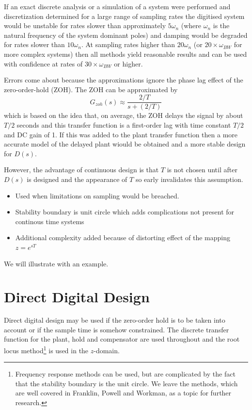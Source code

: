 If an exact discrete analysis or a simulation of a system were performed and
discretization determined for a large range of sampling rates the digitised
system would be unstable for rates slower than approximately $5\omega_n$
(where $\omega_n$ is the natural frequency of the system dominant poles)
and damping would be degraded for rates slower than $10\omega_n$.
At sampling rates higher than $20\omega_n$ (or $20\times \omega_{BW}$ for
more complex systems) then all methods yield reasonable results and can be used
with confidence at rates of $30\times \omega_{BW}$ or higher.

Errors come about because the approximations ignore the phase lag effect of the
zero-order-hold (ZOH). The ZOH can be approximated by $$G_{zoh}(s)\approx
\frac{2/T}{s+(2/T)}$$ which is based on the idea that, on average, the ZOH delays
the signal by about $T/2$ seconds and this transfer function is a first-order
lag with time constant $T/2$ and DC gain of 1. If this was added to the plant
transfer function then a more accurate model of the delayed plant wiould be
obtained and a more stable design for $D(s)$.

However, the advantage of continuous design is that $T$ is not chosen until
after $D(s)$ is designed and the appearance of $T$ so early invalidates this
assumption.

\ifslidesonly
\begin{slide}
\begin{itemize}
\item Used when limitations on sampling would be breached.
\item Stability boundary is unit circle which adds complications not present for
continous time systems
\item Additional complexity added because of distorting effect of the mapping $z=e^{sT}$
\end{itemize}
We will illustrate with an example.
\end{slide}
\fi
\section*{Direct Digital Design}

Direct digital design may be used if the zero-order hold is to be taken into
account or if the sample time is somehow constrained. The discrete transfer
function for the plant, hold and compensator are used throughout and the root
locus method\footnote{Frequency response methods can be used, but are complicated
by the fact that the stability boundary is the unit circle. We leave the methods,
which are well covered in Franklin, Powell and Workman, as a topic for further
research.} is used in the $z$-domain.

